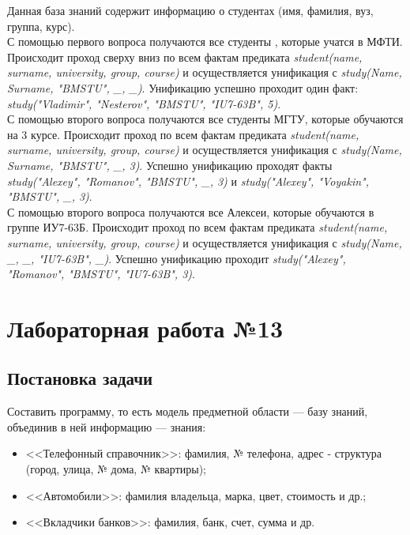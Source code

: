 \documentclass[12pt]{report}
\begin{document}
Данная база знаний содержит информацию о студентах (имя, фамилия, вуз, группа, курс).\\

С помощью первого вопроса получаются все студенты , которые учатся в МФТИ. Происходит проход сверху вниз по всем фактам предиката \emph{student(name, surname, university, group, course)} и осуществляется унификация с \emph{study(Name, Surname, "BMSTU"{}, \_, \_)}. Унификацию успешно проходит один факт: \emph{study("Vladimir"{}, "Nesterov"{}, "BMSTU"{}, "IU7-63B"{}, 5)}.\\

С помощью второго вопроса получаются все студенты МГТУ, которые обучаются на 3 курсе.  Происходит проход по всем фактам предиката \emph{student(name, surname, university, group, course)} и осуществляется унификация с \emph{study(Name, Surname, "BMSTU"{}, \_, 3)}.  Успешно унификацию проходят факты \emph{study("Alexey"{}, "Romanov"{}, "BMSTU"{}, \_, 3)} и \emph{study("Alexey"{}, "Voyakin"{}, "BMSTU"{}, \_, 3)}.\\

С помощью второго вопроса получаются все Алексеи, которые обучаются в группе ИУ7-63Б.  Происходит проход по всем фактам предиката \emph{student(name, surname, university, group, course)} и осуществляется унификация с \emph{study(Name, \_, \_, "IU7-63B"{}, \_)}.  Успешно унификацию проходит \emph{study("Alexey"{}, "Romanov"{}, "BMSTU"{}, "IU7-63B"{}, 3)}.\\

\chapter*{Лабораторная работа №13}
\section*{Постановка задачи}
Составить программу, то есть модель предметной области — базу знаний, объединив в ней информацию — знания:

\begin{itemize}
	\item <<Телефонный справочник>>: фамилия, № телефона, адрес - структура (город, улица, № дома, № квартиры);
	\item <<Автомобили>>: фамилия владельца, марка, цвет, стоимость и др.;
	\item <<Вкладчики банков>>: фамилия, банк, счет, сумма и др.
\end{itemize}
\end{document}
